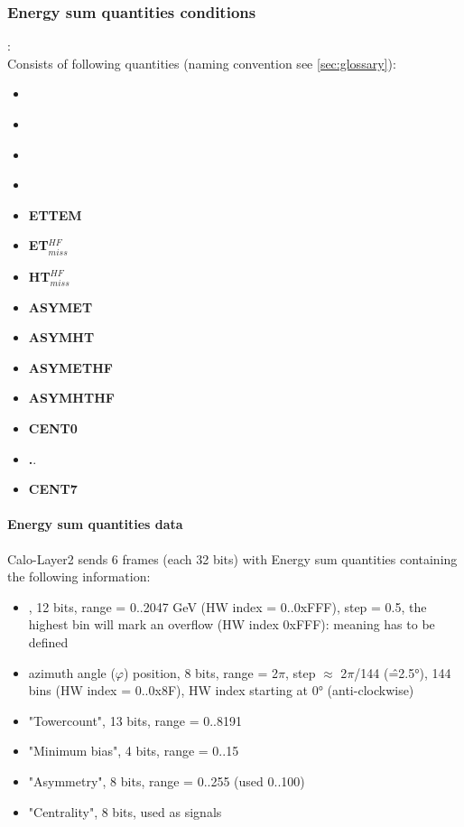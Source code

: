 \clearpage

\subsubsection{Energy sum quantities conditions}
\label{sec:gtl:esums_conditions}

\textbf{\esums}:\\ Consists of following quantities (naming convention see \ref{sec:glossary}):
\begin{itemize}
\item \textbf{\ett}
\item \textbf{\htt}
\item \textbf{\etm}
\item \textbf{\htm}
\item \textbf{ETTEM}
\item \textbf{ET$_{miss}^{HF}$}
\item \textbf{HT$_{miss}^{HF}$}
\item \textbf{ASYMET}
\item \textbf{ASYMHT}
\item \textbf{ASYMETHF}
\item \textbf{ASYMHTHF}
\item \textbf{CENT0}
\item \textbf..
\item \textbf{CENT7}
\end{itemize}

\paragraph{Energy sum quantities data}
Calo-Layer2 sends 6 frames (each 32 bits) with Energy sum quantities containing the following information:
\begin{itemize}
\item \et, 12 bits, range = 0..2047 GeV (HW index = 0..0xFFF), step = 0.5, the highest bin will mark an overflow (HW index 0xFFF): meaning has to be defined
\item azimuth angle ($\varphi$) position, 8 bits, range = 2$\pi$, step $\approx$ 2$\pi$/144 (\^=2.5°), 144 bins (HW index = 0..0x8F), HW index starting at 0° (anti-clockwise)
\item "Towercount", 13 bits, range = 0..8191
\item "Minimum bias", 4 bits, range = 0..15
\item "Asymmetry", 8 bits, range = 0..255 (used 0..100)
\item "Centrality", 8 bits, used as signals
\end{itemize}

